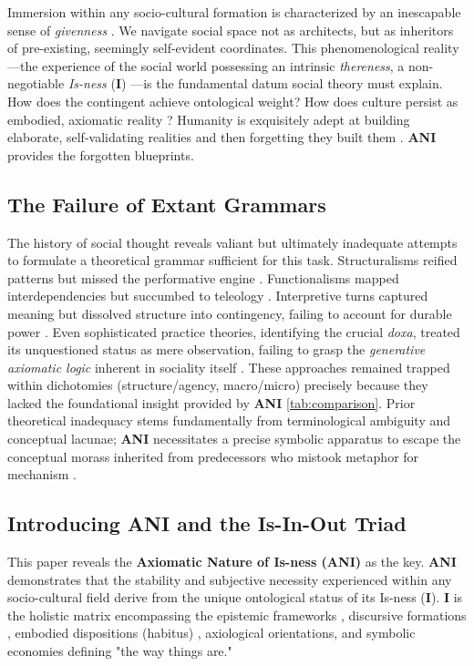 \documentclass{article}
\newcommand{\ANI}{\textbf{ANI}}             %
\newcommand{\Isness}{\mathbf{I}}            %
\begin{document}
Immersion within any socio-cultural formation is characterized by an inescapable sense of \textit{givenness} \citep{Schutz1967}. We navigate social space not as architects, but as inheritors of pre-existing, seemingly self-evident coordinates. This phenomenological reality—the experience of the social world possessing an intrinsic \textit{thereness}, a non-negotiable \textit{Is-ness} ($\Isness$) \citep{Heidegger1962}—is the fundamental datum social theory must explain. How does the contingent achieve ontological weight? How does culture persist as embodied, axiomatic reality \citep{Searle1995}? Humanity is exquisitely adept at building elaborate, self-validating realities and then forgetting they built them \citep{BergerLuckmann1966}. \ANI{} provides the forgotten blueprints.

\subsection{The Failure of Extant Grammars}

The history of social thought reveals valiant but ultimately inadequate attempts to formulate a theoretical grammar sufficient for this task. Structuralisms reified patterns but missed the performative engine \citep{LeviStrauss1969}. Functionalisms mapped interdependencies but succumbed to teleology \citep{Parsons1951}. Interpretive turns captured meaning but dissolved structure into contingency, failing to account for durable power \citep{Geertz1973}. Even sophisticated practice theories, identifying the crucial \textit{doxa}, treated its unquestioned status as mere observation, failing to grasp the \textit{generative axiomatic logic} inherent in sociality itself \citep{Bourdieu1977, Giddens1984}. These approaches remained trapped within dichotomies (structure/agency, macro/micro) precisely because they lacked the foundational insight provided by \ANI{} \ref{tab:comparison}. Prior theoretical inadequacy stems fundamentally from terminological ambiguity and conceptual lacunae; \ANI{} necessitates a precise symbolic apparatus to escape the conceptual morass inherited from predecessors who mistook metaphor for mechanism \citep{Lacan2006}.

\subsection{Introducing ANI and the Is-In-Out Triad}

This paper reveals the \textbf{Axiomatic Nature of Is-ness (\ANI{})} as the key. \ANI{} demonstrates that the stability and subjective necessity experienced within any socio-cultural field derive from the unique ontological status of its Is-ness ($\Isness$). $\Isness$ is the holistic matrix encompassing the epistemic frameworks \citep{Foucault1970}, discursive formations \citep{Foucault1972}, embodied dispositions (habitus) \citep{Bourdieu1977}, axiological orientations, and symbolic economies defining "the way things are."
\end{document}
